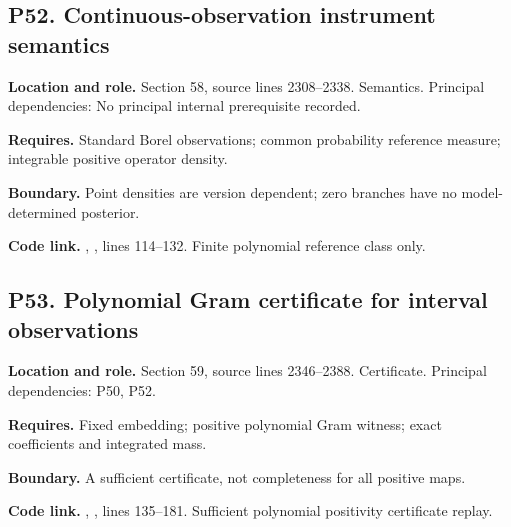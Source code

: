 \documentclass[11pt,letterpaper]{article}
\begin{document}
\par\noindent\begin{minipage}{\textwidth}
\subsection{P52. Continuous-observation instrument
semantics}\label{p52.-continuous-observation-instrument-semantics}

\textbf{Location and role.} Section 58, source lines 2308--2338.
Semantics. Principal dependencies: No principal internal prerequisite
recorded.

\textbf{Requires.} Standard Borel observations; common probability
reference measure; integrable positive operator density.

\textbf{Boundary.} Point densities are version dependent; zero branches
have no model-determined posterior.

\textbf{Code link.} ,
, lines 114--132. Finite polynomial reference
class only.
\end{minipage}\par\medskip

\par\noindent\begin{minipage}{\textwidth}
\subsection{P53. Polynomial Gram certificate for interval
observations}\label{p53.-polynomial-gram-certificate-for-interval-observations}

\textbf{Location and role.} Section 59, source lines 2346--2388.
Certificate. Principal dependencies: P50, P52.

\textbf{Requires.} Fixed embedding; positive polynomial Gram witness;
exact coefficients and integrated mass.

\textbf{Boundary.} A sufficient certificate, not completeness for all
positive maps.

\textbf{Code link.} ,
, lines 135--181. Sufficient polynomial
positivity certificate replay.
\end{minipage}\par\medskip
\end{document}
